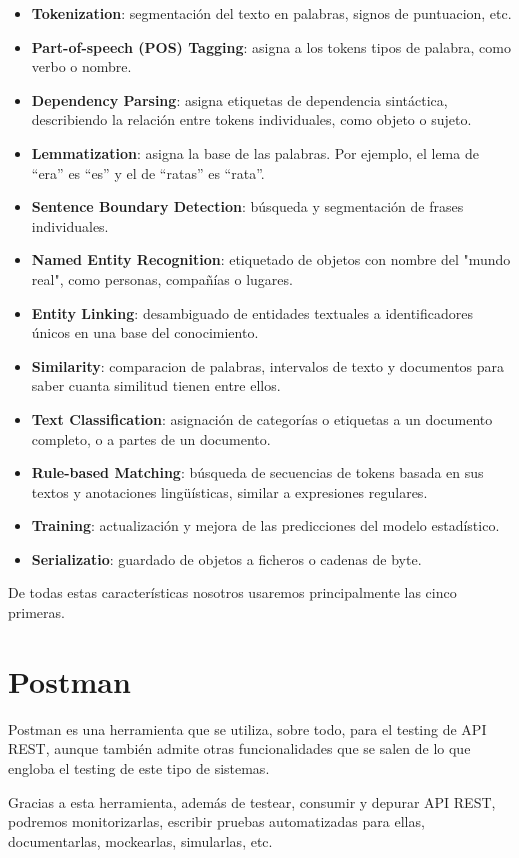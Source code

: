 \begin{itemize}
	\item \textbf{Tokenization}: segmentación del texto en palabras, signos de puntuacion, etc.
	\item \textbf{Part-of-speech (POS) Tagging}: asigna a los tokens tipos de palabra, como verbo o nombre.
	\item \textbf{Dependency Parsing}: asigna etiquetas de dependencia sintáctica, describiendo la relación entre tokens individuales, como objeto o sujeto.
	\item \textbf{Lemmatization}: asigna la base de las palabras. Por ejemplo, el lema de ``era'' es ``es'' y el de ``ratas'' es ``rata''.
	\item \textbf{Sentence Boundary Detection}: búsqueda y segmentación de frases individuales.
	\item \textbf{Named Entity Recognition}: etiquetado de objetos con nombre del "mundo real", como personas, compañías o lugares.
	\item \textbf{Entity Linking}: desambiguado de entidades textuales a identificadores únicos en una base del conocimiento.
	\item \textbf{Similarity}: comparacion de palabras, intervalos de texto y documentos para saber cuanta similitud tienen entre ellos.
	\item \textbf{Text Classification}: asignación de categorías o etiquetas a un documento completo, o a partes de un documento.
	\item \textbf{Rule-based Matching}: búsqueda de secuencias de tokens basada en sus textos y anotaciones lingüísticas, similar a expresiones regulares.
	\item \textbf{Training}: actualización y mejora de las predicciones del modelo estadístico.
	\item \textbf{Serializatio}: guardado de objetos a ficheros o cadenas de byte.
\end{itemize}
De todas estas características nosotros usaremos principalmente las cinco primeras.

\section{Postman}\label{sec:postman}
Postman es una herramienta que se utiliza, sobre todo, para el testing de API REST, aunque también admite otras funcionalidades que se salen de lo que engloba el testing de este tipo de sistemas.

Gracias a esta herramienta, además de testear, consumir y depurar API REST, podremos monitorizarlas, escribir pruebas automatizadas para ellas, documentarlas, mockearlas, simularlas, etc.

